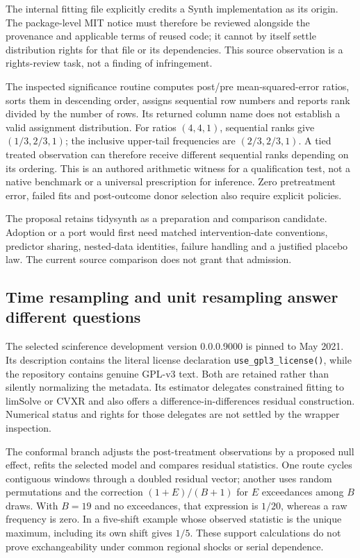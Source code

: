 The internal fitting file explicitly credits a Synth implementation as its
origin. The package-level MIT notice must therefore be reviewed alongside
the provenance and applicable terms of reused code; it cannot by itself
settle distribution rights for that file or its dependencies. This source
observation is a rights-review task, not a finding of infringement.
\citep{exec25_synthr_tidysynth,exec24_synth_source}

The inspected significance routine computes post/pre mean-squared-error
ratios, sorts them in descending order, assigns sequential row numbers and
reports rank divided by the number of rows. Its returned column name does
not establish a valid assignment distribution. For ratios $(4,4,1)$, sequential
ranks give $(1/3,2/3,1)$; the inclusive upper-tail frequencies are
$(2/3,2/3,1)$. A tied treated observation can therefore receive different
sequential ranks depending on its ordering. This is an authored arithmetic
witness for a qualification test, not a native benchmark or a universal
prescription for inference. Zero pretreatment error, failed fits and
post-outcome donor selection also require explicit policies.
\citep{exec25_synthr_tidysynth,exec25_synthr_choice}

The proposal retains tidysynth as a preparation and comparison candidate.
Adoption or a port would first need matched intervention-date conventions,
predictor sharing, nested-data identities, failure handling and a justified
placebo law. The current source comparison does not grant that admission.
\citep{exec25_synthr_choice}

\subsection{Time resampling and unit resampling answer different questions}
The selected scinference development version 0.0.0.9000 is pinned to May
2021. Its description contains the literal license declaration
\texttt{use\_gpl3\_license()}, while the repository contains genuine GPL-v3
text. Both are retained rather than silently normalizing the metadata.
Its estimator delegates constrained fitting to limSolve or CVXR and also
offers a difference-in-differences residual construction. Numerical status
and rights for those delegates are not settled by the wrapper inspection.
\citep{exec25_synthr_scinference}

The conformal branch adjusts the post-treatment observations by a proposed
null effect, refits the selected model and compares residual statistics.
One route cycles contiguous windows through a doubled residual vector; another
uses random permutations and the correction $(1+E)/(B+1)$ for $E$
exceedances among $B$ draws. With $B=19$ and no exceedances, that expression
is $1/20$, whereas a raw frequency is zero. In a five-shift example whose
observed statistic is the unique maximum, including its own shift gives
$1/5$. These support calculations do not prove exchangeability under common
regional shocks or serial dependence.~\citep{exec25_synthr_scinference,
exec25_synthr_choice}

